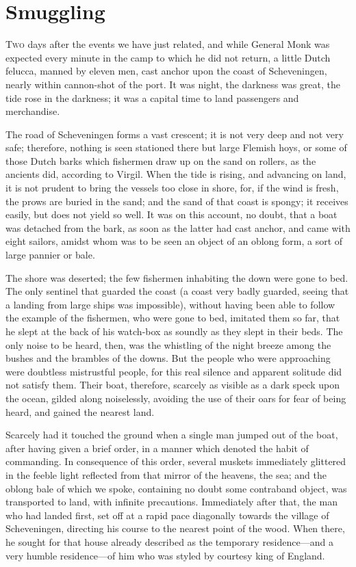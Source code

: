 \chapter{Smuggling}

\lettrine{T}{wo} days after the events we have just related, and while General Monk was expected every minute in the camp to which he did not return, a little Dutch felucca, manned by eleven men, cast anchor upon the coast of Scheveningen, nearly within cannon-shot of the port. It was night, the darkness was great, the tide rose in the darkness; it was a capital time to land passengers and merchandise.

The road of Scheveningen forms a vast crescent; it is not very deep and not very safe; therefore, nothing is seen stationed there but large Flemish hoys, or some of those Dutch barks which fishermen draw up on the sand on rollers, as the ancients did, according to Virgil. When the tide is rising, and advancing on land, it is not prudent to bring the vessels too close in shore, for, if the wind is fresh, the prows are buried in the sand; and the sand of that coast is spongy; it receives easily, but does not yield so well. It was on this account, no doubt, that a boat was detached from the bark, as soon as the latter had cast anchor, and came with eight sailors, amidst whom was to be seen an object of an oblong form, a sort of large pannier or bale.

The shore was deserted; the few fishermen inhabiting the down were gone to bed. The only sentinel that guarded the coast (a coast very badly guarded, seeing that a landing from large ships was impossible), without having been able to follow the example of the fishermen, who were gone to bed, imitated them so far, that he slept at the back of his watch-box as soundly as they slept in their beds. The only noise to be heard, then, was the whistling of the night breeze among the bushes and the brambles of the downs. But the people who were approaching were doubtless mistrustful people, for this real silence and apparent solitude did not satisfy them. Their boat, therefore, scarcely as visible as a dark speck upon the ocean, gilded along noiselessly, avoiding the use of their oars for fear of being heard, and gained the nearest land.

Scarcely had it touched the ground when a single man jumped out of the boat, after having given a brief order, in a manner which denoted the habit of commanding. In consequence of this order, several muskets immediately glittered in the feeble light reflected from that mirror of the heavens, the sea; and the oblong bale of which we spoke, containing no doubt some contraband object, was transported to land, with infinite precautions. Immediately after that, the man who had landed first, set off at a rapid pace diagonally towards the village of Scheveningen, directing his course to the nearest point of the wood. When there, he sought for that house already described as the temporary residence—and a very humble residence—of him who was styled by courtesy king of England.


